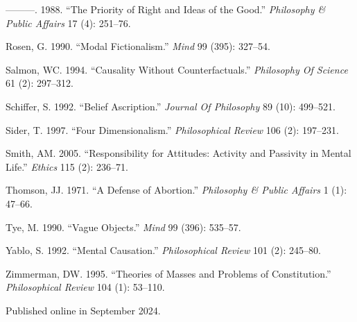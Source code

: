 \documentclass[
  10pt,
  letterpaper,
  DIV=11,
  numbers=noendperiod,
  twoside]{scrartcl}
\newlength{\cslhangindent}
\newenvironment{CSLReferences}[2] %
 {\begin{list}{}{%
  \setlength{\itemindent}{0pt}
  \setlength{\leftmargin}{0pt}
  \setlength{\parsep}{0pt}
  \ifodd #1
   \setlength{\leftmargin}{\cslhangindent}
   \setlength{\itemindent}{-1\cslhangindent}
  \fi
  \setlength{\itemsep}{#2\baselineskip}}}
 {\end{list}}
\begin{document}
\begin{CSLReferences}{1}{0}
---------. 1988. {``The Priority of Right and Ideas of the Good.''}
\emph{Philosophy \& Public Affairs} 17 (4): 251--76.

Rosen, G. 1990. {``Modal Fictionalism.''} \emph{Mind} 99 (395): 327--54.

Salmon, WC. 1994. {``Causality Without Counterfactuals.''}
\emph{Philosophy Of Science} 61 (2): 297--312.

Schiffer, S. 1992. {``Belief Ascription.''} \emph{Journal Of Philosophy}
89 (10): 499--521.

Sider, T. 1997. {``Four Dimensionalism.''} \emph{Philosophical Review}
106 (2): 197--231.

Smith, AM. 2005. {``Responsibility for Attitudes: Activity and Passivity
in Mental Life.''} \emph{Ethics} 115 (2): 236--71.

Thomson, JJ. 1971. {``A Defense of Abortion.''} \emph{Philosophy \&
Public Affairs} 1 (1): 47--66.

Tye, M. 1990. {``Vague Objects.''} \emph{Mind} 99 (396): 535--57.

Yablo, S. 1992. {``Mental Causation.''} \emph{Philosophical Review} 101
(2): 245--80.

Zimmerman, DW. 1995. {``Theories of Masses and Problems of
Constitution.''} \emph{Philosophical Review} 104 (1): 53--110.

\end{CSLReferences}



\noindent Published online in September 2024.
\end{document}
